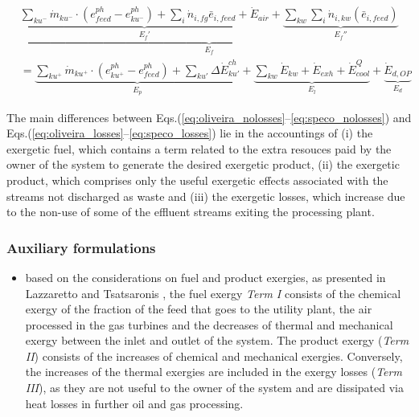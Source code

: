  \begin{align}
	&\underbrace{\underbrace{\sum_{ku^{-}} \dot{m}_{ku^{-}}\cdot(e_{feed}^{ph}-e_{ku^{-}}^{ph})+\sum_i \dot{n}_{i,fg}\bar{e}_{i,feed}+\dot{E}_{air}}_{E_f'}+\underbrace{\sum_{kw}\sum_i \dot{n}_{i,kw}(\bar{e}_{i,feed})}_{E_f''}}_{E_f} \nonumber\\
	&=\underbrace{\sum_{ku^{+}}\dot{m}_{ku^{+}}\cdot(e_{ku^{+}}^{ph}-e_{feed}^{ph})+\sum_{ku'}\Delta{\dot{E}}^{ch}_{ku'}}_{E_p}+\underbrace{\sum_{kw} \dot{E}_{kw}+\dot{E}_{exh}+\dot{E}^Q_{cool}}_{E_l}+\underbrace{\dot{E}_{d,OP}}_{E_d}
	\label{eq:speco_losses}
\end{align}	

The main differences between Eqs.(\ref{eq:oliveira_nolosses}--\ref{eq:speco_nolosses}) and Eqs.(\ref{eq:oliveira_losses}--\ref{eq:speco_losses}) lie in the accountings of (i) the exergetic fuel, which contains a term related to the extra resouces paid by the owner of the system to generate the desired exergetic product, (ii) the exergetic product, which comprises only the useful exergetic effects associated with the streams not discharged as waste and (iii) the exergetic losses, which increase due to the non-use of some of the effluent streams exiting the processing plant. 



\subsubsection{Auxiliary formulations}


 
\begin{itemize}
	\item based on the considerations on fuel and product exergies, as presented in Lazzaretto and Tsatsaronis \cite{Lazzaretto1999,Lazzaretto2006}, the fuel exergy \emph{Term I} consists of the chemical exergy of the fraction of the feed that goes to the utility plant, the air processed in the gas turbines and the decreases of thermal and mechanical exergy between the inlet and outlet of the system. The product exergy (\emph{Term II}) consists of the increases of chemical and mechanical exergies. Conversely, the increases of the thermal exergies are included in the exergy losses (\emph{Term III}), as they are not useful to the owner of the system and are dissipated via heat losses in further oil and gas processing.
\end{itemize}

